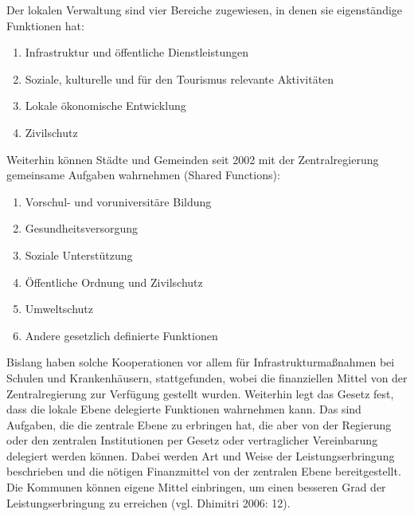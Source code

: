 Der lokalen Verwaltung sind vier Bereiche zugewiesen, in denen sie eigenständige Funktionen hat: 
\begin{enumerate}[label={\arabic*}.]
\item Infrastruktur und öffentliche Dienstleistungen
\item Soziale, kulturelle und für den Tourismus relevante Aktivitäten
\item Lokale ökonomische Entwicklung
\item Zivilschutz
\end{enumerate}
Weiterhin können Städte und Gemeinden seit 2002 mit der Zentralregierung gemeinsame Aufgaben wahrnehmen (Shared Functions): 

\begin{enumerate}[label={\arabic*}.]
\item Vorschul- und voruniversitäre Bildung
\item Gesundheitsversorgung 
\item Soziale Unterstützung
\item Öffentliche Ordnung und Zivilschutz
\item Umweltschutz
\item Andere gesetzlich definierte Funktionen
\end{enumerate}
Bislang haben solche Kooperationen vor allem für Infrastrukturmaßnahmen bei Schulen und Krankenhäusern, stattgefunden, wobei die finanziellen Mittel von der Zentralregierung zur Verfügung gestellt wurden. Weiterhin legt das Gesetz fest, dass die lokale Ebene delegierte Funktionen wahrnehmen kann. Das sind Aufgaben, die die zentrale Ebene zu erbringen hat, die aber von der Regierung oder den zentralen Institutionen per Gesetz oder vertraglicher Vereinbarung delegiert werden können. Dabei werden Art und Weise der Leistungserbringung beschrieben und die nötigen Finanzmittel von der zentralen Ebene bereitgestellt. Die Kommunen können eigene Mittel einbringen, um einen besseren Grad der Leistungserbringung zu erreichen (vgl. Dhimitri 2006: 12).\par
